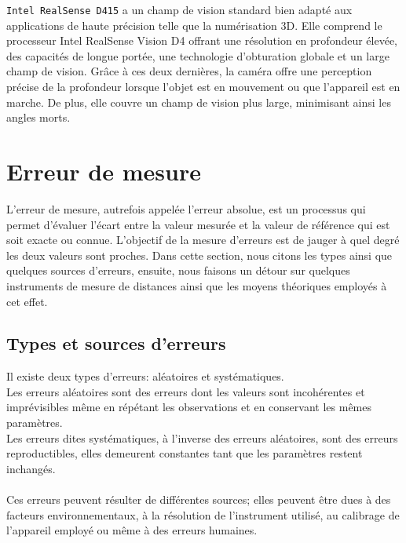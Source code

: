 \documentclass[a4paper, 12pt]{book}
\begin{document}
\par \texttt{Intel RealSense D415} a un champ de vision standard bien adapté aux applications de haute précision telle que la numérisation 3D. Elle comprend le processeur Intel RealSense Vision D4 offrant une résolution en profondeur élevée, des capacités de longue portée, une technologie d'obturation globale et un large champ de vision. Grâce à ces deux dernières, la caméra offre une perception précise de la profondeur lorsque l'objet est en mouvement ou que l'appareil est en marche. De plus, elle couvre un champ de vision plus large, minimisant ainsi les angles morts.

\section{Erreur de mesure}
L'erreur de mesure, autrefois appelée l'erreur absolue, est un processus qui permet d'évaluer l'écart entre la valeur mesurée et la valeur de référence qui est soit exacte ou connue. L'objectif de la mesure d'erreurs est de jauger à quel degré les deux valeurs sont proches. 
Dans cette section, nous citons les types ainsi que quelques sources d'erreurs, ensuite,  nous faisons un détour sur quelques instruments de mesure de distances ainsi que les moyens théoriques employés à cet effet.
\subsection{Types et sources d'erreurs}
Il existe deux types d'erreurs: aléatoires et systématiques. \\ Les erreurs aléatoires sont des erreurs dont les valeurs sont incohérentes et imprévisibles même en répétant les observations et en conservant les mêmes paramètres. \\Les erreurs dites systématiques, à l'inverse des erreurs aléatoires, sont des erreurs reproductibles, elles demeurent constantes tant que les paramètres restent inchangés. \\ \\
Ces erreurs peuvent résulter de différentes sources; elles peuvent être dues à des facteurs environnementaux, à la résolution de l'instrument utilisé, au calibrage de l'appareil employé ou même à des erreurs humaines. \\ \\
\end{document}
